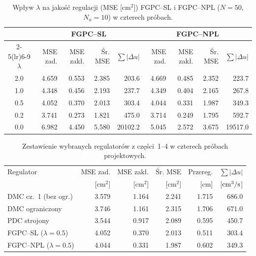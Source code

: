 \begin{table}[H]
\centering
\caption{Wpływ $\lambda$ na jakość regulacji (MSE [$\mathrm{cm^2}$]) FGPC--SL i FGPC--NPL ($N=50$, $N_u=10$) w czterech próbach.}
\small
\begin{tabular}{crrrrrrrr}\toprule
 & \multicolumn{4}{c}{FGPC--SL} & \multicolumn{4}{c}{FGPC--NPL}\\\cmidrule(lr){2-5}\cmidrule(lr){6-9}
$\lambda$ & MSE zad. & MSE zakł. & Śr. MSE & $\sum|\Delta u|$ & MSE zad. & MSE zakł. & Śr. MSE & $\sum|\Delta u|$\\\midrule
\num{2.0} & \num{4.659} & \num{0.553} & \num{2.385} & \num{203.6} & \num{4.669} & \num{0.485} & \num{2.352} & \num{223.7}\\
\num{1.0} & \num{4.348} & \num{0.456} & \num{2.193} & \num{237.7} & \num{4.349} & \num{0.404} & \num{2.165} & \num{267.8}\\
\num{0.5} & \num{4.052} & \num{0.370} & \num{2.013} & \num{303.4} & \num{4.044} & \num{0.331} & \num{1.987} & \num{349.3}\\
\num{0.2} & \num{3.741} & \num{0.273} & \num{1.821} & \num{475.0} & \num{3.714} & \num{0.249} & \num{1.795} & \num{592.7}\\
\num{0.0} & \num{6.982} & \num{4.450} & \num{5.580} & \num{20102.2} & \num{5.045} & \num{2.572} & \num{3.675} & \num{19517.0}\\\bottomrule
\end{tabular}
\label{tab:npl-tuning}
\end{table}

\begin{table}[H]
\centering
\caption{Zestawienie wybranych regulatorów z części~1--4 w czterech próbach projektowych.}
\small
\begin{tabular}{lrrrrr}\toprule
Regulator & MSE zad. & MSE zakł. & Śr. MSE & Przereg. & $\sum|\Delta u|$\\
 & [$\mathrm{cm^2}$] & [$\mathrm{cm^2}$] & [$\mathrm{cm^2}$] & [cm] & [$\mathrm{cm^3/s}$]\\\midrule
DMC cz.~1 (bez ogr.)      & \num{3.579} & \num{1.164} & \num{2.241} & \num{1.715} & \num{686.0}\\
DMC ograniczony           & \num{3.746} & \num{1.161} & \num{2.315} & \num{1.706} & \num{671.0}\\
PDC strojony              & \num{3.544} & \num{0.917} & \num{2.089} & \num{0.595} & \num{450.7}\\
FGPC--SL ($\lambda=\num{0.5}$)& \num{4.052} & \num{0.370} & \num{2.013} & \num{0.511} & \num{303.4}\\
FGPC--NPL ($\lambda=\num{0.5}$)& \num{4.044} & \num{0.331} & \num{1.987} & \num{0.602} & \num{349.3}\\\bottomrule
\end{tabular}
\label{tab:npl-summary}
\end{table}

